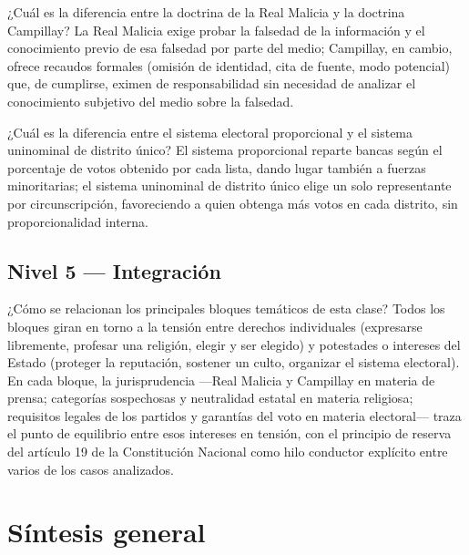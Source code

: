 \documentclass[12pt,oneside]{book}
\begin{document}
\begin{exercise}{¿Cuál es la diferencia entre la doctrina de la Real Malicia y la doctrina Campillay?}
La Real Malicia exige probar la falsedad de la información y el conocimiento previo de esa falsedad por parte del medio; Campillay, en cambio, ofrece recaudos formales (omisión de identidad, cita de fuente, modo potencial) que, de cumplirse, eximen de responsabilidad sin necesidad de analizar el conocimiento subjetivo del medio sobre la falsedad.
\end{exercise}

\begin{exercise}{¿Cuál es la diferencia entre el sistema electoral proporcional y el sistema uninominal de distrito único?}
El sistema proporcional reparte bancas según el porcentaje de votos obtenido por cada lista, dando lugar también a fuerzas minoritarias; el sistema uninominal de distrito único elige un solo representante por circunscripción, favoreciendo a quien obtenga más votos en cada distrito, sin proporcionalidad interna.
\end{exercise}

\subsection*{Nivel 5 --- Integración}

\begin{exercise}{¿Cómo se relacionan los principales bloques temáticos de esta clase?}
Todos los bloques giran en torno a la tensión entre derechos individuales (expresarse libremente, profesar una religión, elegir y ser elegido) y potestades o intereses del Estado (proteger la reputación, sostener un culto, organizar el sistema electoral). En cada bloque, la jurisprudencia —Real Malicia y Campillay en materia de prensa; categorías sospechosas y neutralidad estatal en materia religiosa; requisitos legales de los partidos y garantías del voto en materia electoral— traza el punto de equilibrio entre esos intereses en tensión, con el principio de reserva del artículo 19 de la Constitución Nacional como hilo conductor explícito entre varios de los casos analizados.
\end{exercise}

\section{Síntesis general}
\end{document}
